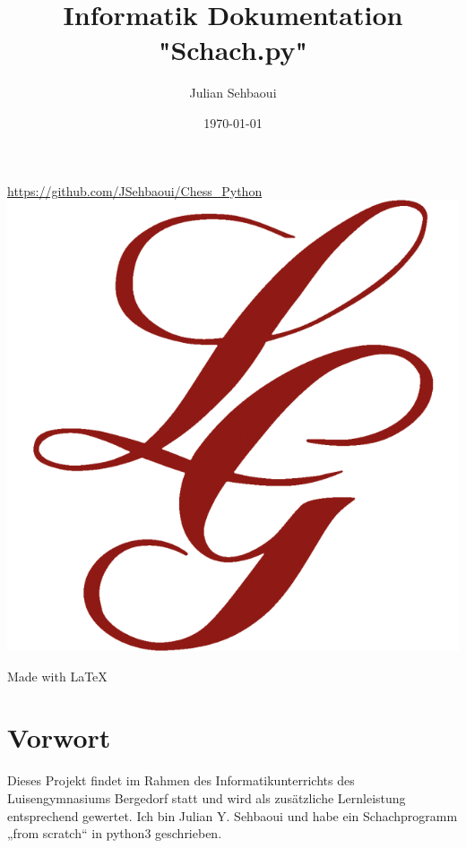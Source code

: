 \documentclass[a4paper, 10pt]{scrartcl}
\title{Informatik Dokumentation "Schach.py"}
\author{Julian Sehbaoui}
\date{\today}
\begin{document}
\begin{titlepage}
        \maketitle
        \centering
        \url{https://github.com/JSehbaoui/Chess_Python}\\
         \vspace{5pt} 
        \includegraphics[scale=0.35]{assets/luisengymnasium.png}\\
         \vspace{5pt} 
        
        Made with \LaTeX{}
\end{titlepage}

\pagebreak
\tableofcontents
\pagebreak

\section{Vorwort}
Dieses Projekt findet im Rahmen des Informatikunterrichts des Luisengymnasiums 	Bergedorf statt und wird als zusätzliche Lernleistung entsprechend gewertet.
Ich bin Julian Y. Sehbaoui und habe ein Schachprogramm „from scratch“ in python3 geschrieben.
\end{document}
